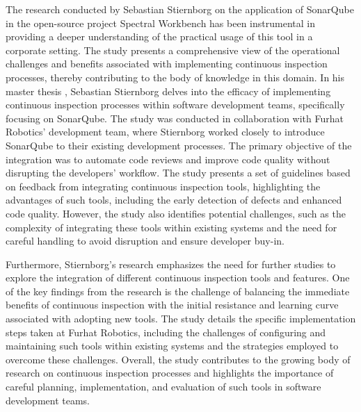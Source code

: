 \par
The research conducted by Sebastian Stiernborg on the application of SonarQube in the open-source project Spectral Workbench has been instrumental in providing a deeper understanding of the practical usage of this tool in a corporate setting. The study presents a comprehensive view of the operational challenges and benefits associated with implementing continuous inspection processes, thereby contributing to the body of knowledge in this domain. In his master thesis \cite{stiernborg2019automated}, Sebastian Stiernborg delves into the efficacy of implementing continuous inspection processes within software development teams, specifically focusing on SonarQube. The study was conducted in collaboration with Furhat Robotics' development team, where Stiernborg worked closely to introduce SonarQube to their existing development processes. The primary objective of the integration was to automate code reviews and improve code quality without disrupting the developers' workflow. The study presents a set of guidelines based on feedback from integrating continuous inspection tools, highlighting the advantages of such tools, including the early detection of defects and enhanced code quality. However, the study also identifies potential challenges, such as the complexity of integrating these tools within existing systems and the need for careful handling to avoid disruption and ensure developer buy-in.
\par
Furthermore, Stiernborg's research emphasizes the need for further studies to explore the integration of different continuous inspection tools and features. One of the key findings from the research is the challenge of balancing the immediate benefits of continuous inspection with the initial resistance and learning curve associated with adopting new tools. The study details the specific implementation steps taken at Furhat Robotics, including the challenges of configuring and maintaining such tools within existing systems and the strategies employed to overcome these challenges. Overall, the study contributes to the growing body of research on continuous inspection processes and highlights the importance of careful planning, implementation, and evaluation of such tools in software development teams.
\par
